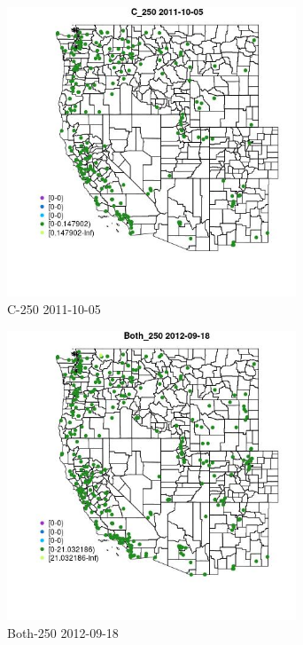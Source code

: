 \begin{figure} 
\centering  
\includegraphics[width=0.77\textwidth]{Code_Outputs/ML_input_report_ML_input_PM25_Step5_part_d_de_duplicated_aves_ML_input_MapObsC_2502011-10-05.jpg} 
\caption{\label{fig:ML_input_report_ML_input_PM25_Step5_part_d_de_duplicated_aves_ML_inputMapObsC_2502011-10-05}C-250 2011-10-05} 
\end{figure} 
 

\begin{figure} 
\centering  
\includegraphics[width=0.77\textwidth]{Code_Outputs/ML_input_report_ML_input_PM25_Step5_part_d_de_duplicated_aves_ML_input_MapObsBoth_2502012-09-18.jpg} 
\caption{\label{fig:ML_input_report_ML_input_PM25_Step5_part_d_de_duplicated_aves_ML_inputMapObsBoth_2502012-09-18}Both-250 2012-09-18} 
\end{figure} 
 

